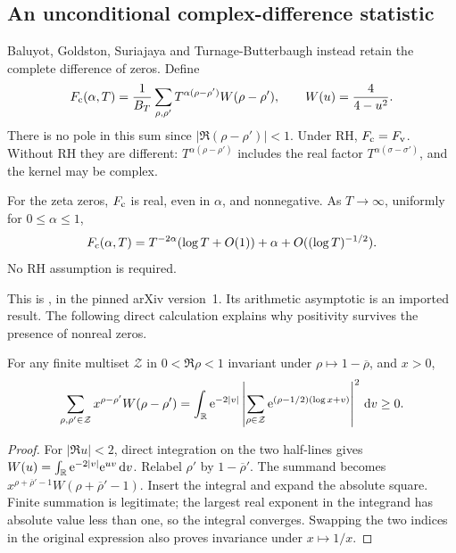 \subsection{An unconditional complex-difference statistic}
Baluyot, Goldston, Suriajaya and Turnage-Butterbaugh instead retain
the complete difference of zeros. Define
\begin{equation}\label{eq:F-complex}
 F_{\rm c}(\alpha,T)=\frac1{B_T}\sum_{\rho,\rho'}
 T^{\alpha(\rho-\rho')}W(\rho-\rho'),\qquad
 W(u)=\frac4{4-u^2}.
\end{equation}
There is no pole in this sum since \(|\Re(\rho-\rho')|<1\).
Under RH, \(F_{\rm c}=F_{\rm v}\). Without RH they are different:
\(T^{\alpha(\rho-\rho')}\) includes the real factor
\(T^{\alpha(\sigma-\sigma')}\), and the kernel may be complex.

\begin{theorem}
\label{thm:BGST}
For the zeta zeros, \(F_{\rm c}\) is real, even in \(\alpha\),
and nonnegative. As \(T\to\infty\), uniformly for
\(0\le\alpha\le1\),
\begin{equation}\label{eq:BGST}
 F_{\rm c}(\alpha,T)
 =T^{-2\alpha}(\log T+O(1))+\alpha
                        +O((\log T)^{-1/2}).
\end{equation}
No RH assumption is required.
\end{theorem}
This is \cite[Theorem~1, (1.2)--(1.4)]{BGST2024}, in the
pinned arXiv version~1. Its arithmetic asymptotic is an imported
result. The following direct calculation explains why positivity
survives the presence of nonreal zeros.

\begin{proposition}
\label{prop:complex-Gram}
For any finite multiset \(\mathcal Z\) in \(0<\Re\rho<1\)
invariant under \(\rho\mapsto1-\overline\rho\), and \(x>0\),
\begin{equation}\label{eq:complex-Gram}
 \sum_{\rho,\rho'\in\mathcal Z}x^{\rho-\rho'}W(\rho-\rho')
 =\int_\mathbb R\mathrm e^{-2|v|}
 \left|\sum_{\rho\in\mathcal Z}
       \mathrm e^{(\rho-1/2)(\log x+v)}\right|^2\,\mathrm d v\ge0.
\end{equation}
\end{proposition}
\begin{proof}
For \(|\Re u|<2\), direct integration on the two half-lines gives
\(W(u)=\int_\mathbb R\mathrm e^{-2|v|}\mathrm e^{uv}\,\mathrm d v\).
Relabel \(\rho'\) by \(1-\overline\rho'\). The summand becomes
\(x^{\rho+\overline\rho'-1}W(\rho+\overline\rho'-1)\).
Insert the integral and expand the absolute square. Finite
summation is legitimate; the largest real exponent in the
integrand has absolute value less than one, so the integral
converges. Swapping the two indices in the original expression
also proves invariance under \(x\mapsto1/x\).
\end{proof}

